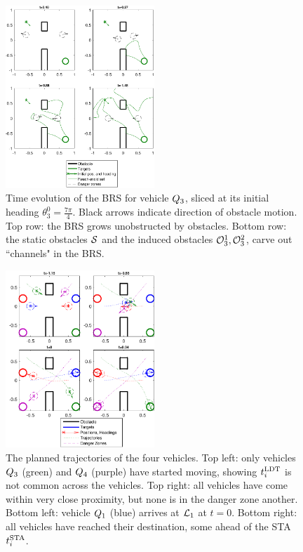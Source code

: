 \begin{figure}
	\centering
	\includegraphics[width=0.5\textwidth]{"fig/dubins_reach_3"}
	\caption{Time evolution of the BRS for vehicle $Q_3$, sliced at its initial heading $\theta_3^0=\frac{7\pi}{4}$. Black arrows indicate direction of obstacle motion. Top row: the BRS grows unobstructed by obstacles. Bottom row: the static obstacles $\mathcal{S}$ and the induced obstacles $\mathcal{O}_3^1,\mathcal{O}_3^2$, carve out ``channels" in the BRS.}
	\label{fig:dubins_reach_3}
\end{figure}

\begin{figure}
	\centering
	\includegraphics[width=0.5\textwidth]{"fig/dubins_result"}
	\caption{The planned trajectories of the four vehicles. Top left: only vehicles $Q_3$ (green) and $Q_4$ (purple) have started moving, showing $t^\text{LDT}_i$ is not common across the vehicles. Top right: all vehicles have come within very close proximity, but none is in the danger zone another. Bottom left: vehicle $Q_1$ (blue) arrives at $\mathcal{L}_1$ at $t=0$. Bottom right: all vehicles have reached their destination, some ahead of the STA $t^\text{STA}_i$.}
	\label{fig:dubins_result}
\end{figure}